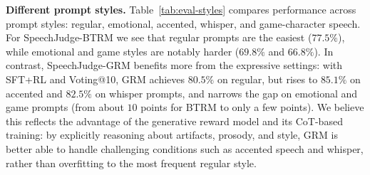 \documentclass[]{bytedance_seed}
\begin{document}
\begin{table}[t]
    \caption{Accuracy of different models on {SpeechJudge-Eval} across prompt styles.}
    \vspace{-2mm}
    \label{tab:eval-styles}
    \centering
\end{table}


\textbf{Different prompt styles.}\quad
Table~\ref{tab:eval-styles} compares performance across prompt styles:
regular, emotional, accented, whisper, and game-character speech.
For SpeechJudge-BTRM we see that regular prompts are the easiest
($77.5\%$), while emotional and game styles are notably harder ($69.8\%$ and
$66.8\%$).
In contrast, SpeechJudge-GRM benefits more from the expressive settings:
with SFT+RL and Voting@10, GRM achieves $80.5\%$ on regular, but rises to
$85.1\%$ on accented and $82.5\%$ on whisper prompts, and narrows the gap on
emotional and game prompts (from about $10$ points for BTRM to only a few
points).
We believe this reflects the advantage of the generative reward model and its
CoT-based training: by explicitly reasoning about artifacts, prosody, and
style, GRM is better able to handle challenging conditions such as accented
speech and whisper, rather than overfitting to the most frequent regular style.
\end{document}
